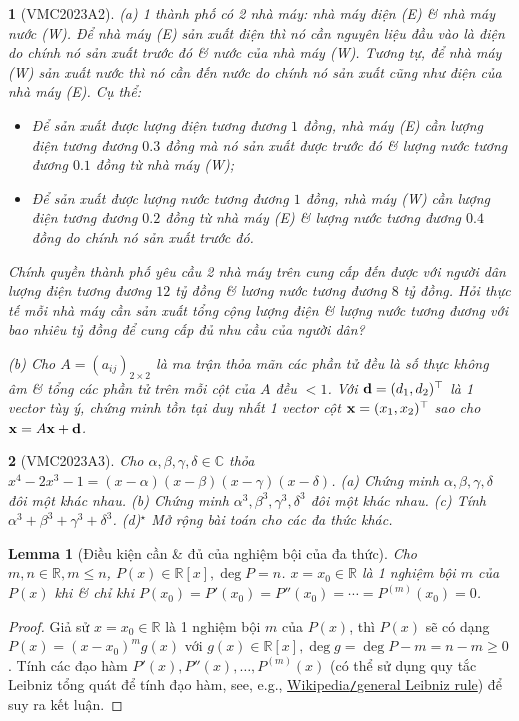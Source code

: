 \documentclass{article}
\newtheorem{baitoan}{}
\newtheorem{lemma}{Lemma}
\begin{document}
\begin{baitoan}[VMC2023A2]
	(a) 1 thành phố có 2 nhà máy: nhà máy điện (E) \& nhà máy nước (W). Để nhà máy (E) sản xuất điện thì nó cần nguyên liệu đầu vào là điện do chính nó sản xuất trước đó \& nước của nhà máy (W). Tương tự, để nhà máy (W) sản xuất nước thì nó cần đến nước do chính nó sản xuất cũng như điện của nhà máy (E). Cụ thể:
	\begin{itemize}
		\item Để sản xuất được lượng điện tương đương $1$ đồng, nhà máy (E) cần lượng điện tương đương $0.3$ đồng mà nó sản xuất được trước đó \& lượng nước tương đương $0.1$ đồng từ nhà máy (W);
		\item Để sản xuất được lượng nước tương đương $1$ đồng, nhà máy (W) cần lượng điện tương đương $0.2$ đồng từ nhà máy (E) \& lượng nước tương đương $0.4$ đồng do chính nó sản xuất trước đó.
	\end{itemize}
	Chính quyền thành phố yêu cầu 2 nhà máy trên cung cấp đến được với người dân lượng điện tương đương $12$ tỷ đồng \& lương nước tương đương $8$ tỷ đồng. Hỏi thực tế mỗi nhà máy cần sản xuất tổng cộng lượng điện \& lượng nước tương đương với bao nhiêu tỷ đồng để cung cấp đủ nhu cầu của người dân?
	
	(b) Cho $A = (a_{ij})_{2\times2}$ là ma trận thỏa mãn các phần tử đều là số thực không âm \& tổng các phần tử trên mỗi cột của $A$ đều $< 1$. Với ${\bf d} = (d_1,d_2)^\top$ là 1 vector tùy ý, chứng minh tồn tại duy nhất 1 vector cột ${\bf x} = (x_1,x_2)^\top$ sao cho ${\bf x} = A{\bf x} + {\bf d}$.
\end{baitoan}

\begin{baitoan}[VMC2023A3]
	Cho $\alpha,\beta,\gamma,\delta\in\mathbb{C}$ thỏa $x^4 - 2x^3 - 1 = (x - \alpha)(x - \beta)(x - \gamma)(x - \delta)$. (a) Chứng minh $\alpha,\beta,\gamma,\delta$ đôi một khác nhau. (b) Chứng minh $\alpha^3,\beta^3,\gamma^3,\delta^3$ đôi một khác nhau. (c) Tính $\alpha^3 + \beta^3 + \gamma^3 +\delta^3$. (d)${}^\star$ Mở rộng bài toán cho các đa thức khác.
\end{baitoan}

\begin{lemma}[Điều kiện cần \& đủ của nghiệm bội của đa thức]
	Cho $m,n\in\mathbb{R},m\le n$, $P(x)\in\mathbb{R}[x],\deg P = n$. $x = x_0\in\mathbb{R}$ là 1 nghiệm bội $m$ của $P(x)$ khi \& chỉ khi $P(x_0) = P'(x_0) = P''(x_0) = \cdots = P^{(m)}(x_0) = 0$.
\end{lemma}

\begin{proof}
	Giả sử $x = x_0\in\mathbb{R}$ là 1 nghiệm bội $m$ của $P(x)$, thì $P(x)$ sẽ có dạng $P(x) = (x - x_0)^mg(x)$ với $g(x)\in\mathbb{R}[x],\deg g = \deg P - m = n - m\ge0$. Tính các đạo hàm $P'(x),P''(x),\ldots,P^{(m)}(x)$ (có thể sử dụng quy tắc Leibniz tổng quát để tính đạo hàm, see, e.g., \href{https://en.wikipedia.org/wiki/General_Leibniz_rule}{Wikipedia{\tt/}general Leibniz rule}) để suy ra kết luận.
\end{proof}
\end{document}
